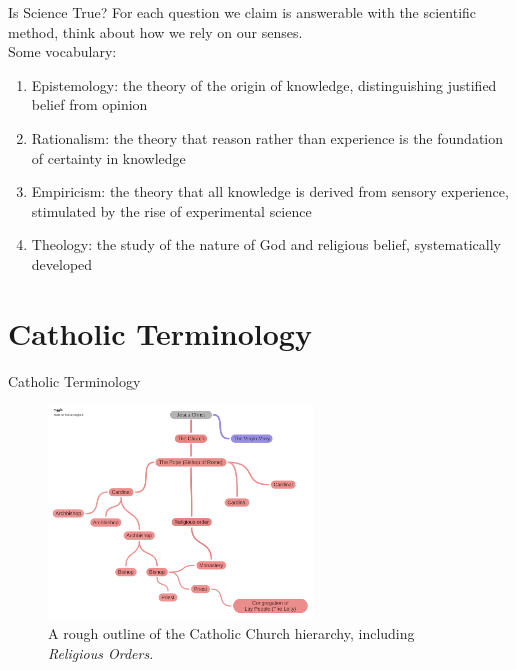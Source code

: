 \documentclass{beamer}
\begin{document}
\begin{frame}{Is Science True?}
For each question we claim is answerable with the scientific method, think about how we rely on our senses. \\ \vspace{0.5cm}
Some vocabulary:
\begin{enumerate}
\item Epistemology: the theory of the origin of knowledge, distinguishing justified belief from opinion
\item Rationalism: the theory that reason rather than experience is the foundation of certainty in knowledge
\item Empiricism: the theory that all knowledge is derived from sensory experience, stimulated by the rise of experimental science
\item Theology: the study of the nature of God and religious belief, systematically developed
\end{enumerate}
\end{frame}

\section{Catholic Terminology}

\begin{frame}{Catholic Terminology}
\begin{figure}
\centering
\includegraphics[width=7cm]{figures/catholic.pdf}
\caption{A rough outline of the Catholic Church hierarchy, including \textit{Religious Orders.}}
\end{figure}
\end{frame}
\end{document}
